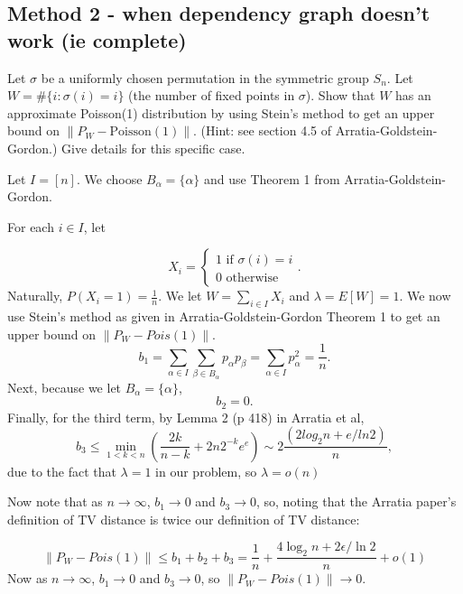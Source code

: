 \documentclass{article}
\newcommand{\answer}[1]{%
  \begin{tcolorbox}[
    colback=gray!9.8,
    boxrule=0.5pt,
    breakable]
  \small #1
  \end{tcolorbox}}
\begin{document}
\subsection{Method 2 - when dependency graph doesn't work (ie complete)}

\begin{example}
    Let $\sigma$ be a uniformly chosen permutation in the symmetric group $S_n$. Let $W = \#\{i : \sigma(i) = i\}$ (the number of fixed points in $\sigma$). Show that $W$ has an approximate Poisson(1) distribution by using Stein's method to get an upper bound on $\|P_W - \text{Poisson}(1)\|$. (Hint: see section 4.5 of Arratia-Goldstein-Gordon.) Give details for this specific case.

\answer{
Let $I = [n]$. We choose $B_\alpha = \{\alpha\}$ and use Theorem 1 from Arratia-Goldstein-Gordon. 

For each $i\in I$, let

$$X_i = \begin{cases}
    1 \text{ if } \sigma(i) = i\\
    0 \text{ otherwise}
\end{cases}.$$
Naturally, $P(X_i =1) = \frac{1}{n}$. We let $W = \sum_{i\in I} X_i$ and $\lambda = E[W] = 1$. We now use Stein's method as given in Arratia-Goldstein-Gordon Theorem 1 to get an upper bound on $\lVert P_W - Pois(1)\rVert$.
$$b_1 = \sum_{\alpha\in I} \sum_{\beta \in B_\alpha} p_\alpha p_\beta = \sum_{\alpha \in I} p_\alpha^2 = \frac{1}{n}.$$
Next, because we let $B_\alpha = \{\alpha\}$, 
$$b_2 = 0.$$
Finally, for the third term, by Lemma 2 (p 418) in Arratia et al,
$$b_3 \leq \min_{1<k<n} (\frac{2k}{n-k} + 2n 2^{-k} e^{e})\sim 2\frac{(2log_2 n + e/ln 2)}{n},$$
due to the fact that $\lambda=1$ in our problem, so $\lambda = o(n)$

Now note that as $n\to \infty$, $b_1\to 0$ and $b_3\to 0$, so, noting that the Arratia paper's definition of TV distance is twice our definition of TV distance:

$$\lVert P_W - Pois(1)\rVert\leq b_1 + b_2 + b_3 = \frac{1}{n} + \frac{4\log_2 n + 2\epsilon/\ln 2}{n} + o(1)$$
Now as $n\to \infty$, $b_1 \to 0$ and $b_3 \to 0$, so $\lVert P_W - Pois(1)\rVert \to 0$. 
}
\end{example}

\begin{example}
    
\end{example}
\end{document}
